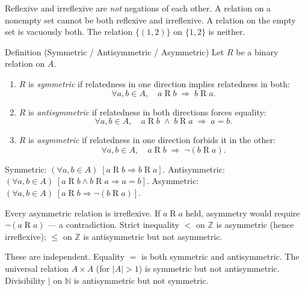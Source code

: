 \begin{remark}[Independence]
Reflexive and irreflexive are \emph{not} negations of each other.
A relation on a nonempty set cannot be both reflexive and irreflexive.
A relation on the empty set is vacuously both.
The relation $\{(1,2)\}$ on $\{1,2\}$ is neither.
\end{remark}

\begin{definitionbox}{Definition (Symmetric / Antisymmetric / Asymmetric)}
\label{def:rel-symmetric}
\label{def:rel-antisymmetric}
\label{def:rel-asymmetric}
Let $R$ be a binary relation on $A$.
\begin{enumerate}[label=(\roman*)]
  \item $R$ is \emph{symmetric} if relatedness in one direction implies
        relatedness in both:
        \[
          \forall a,b \in A,\quad a \mathrel{R} b \;\Rightarrow\; b \mathrel{R} a.
        \]
  \item $R$ is \emph{antisymmetric} if relatedness in both directions
        forces equality:
        \[
          \forall a,b \in A,\quad
          a \mathrel{R} b \;\land\; b \mathrel{R} a \;\Rightarrow\; a = b.
        \]
  \item $R$ is \emph{asymmetric} if relatedness in one direction forbids
        it in the other:
        \[
          \forall a,b \in A,\quad
          a \mathrel{R} b \;\Rightarrow\; \lnot(b \mathrel{R} a).
        \]
\end{enumerate}
\end{definitionbox}

\begin{remark}
Symmetric: $(\forall a,b \in A)\;[a \mathrel{R} b \Rightarrow b \mathrel{R} a]$.
Antisymmetric: $(\forall a,b \in A)\;
[a \mathrel{R} b \land b \mathrel{R} a \Rightarrow a = b]$.
Asymmetric: $(\forall a,b \in A)\;
[a \mathrel{R} b \Rightarrow \lnot(b \mathrel{R} a)]$.
\end{remark}

\begin{remark}
Every asymmetric relation is irreflexive.
If $a \mathrel{R} a$ held, asymmetry would require $\lnot(a \mathrel{R} a)$ —
a contradiction.
Strict inequality $<$ on $\mathbb{Z}$ is asymmetric (hence irreflexive);
$\leq$ on $\mathbb{Z}$ is antisymmetric but not asymmetric.
\end{remark}

\begin{remark}
These are independent.
Equality $=$ is both symmetric and antisymmetric.
The universal relation $A \times A$ (for $|A| > 1$) is symmetric but
not antisymmetric.
Divisibility $\mid$ on $\mathbb{N}$ is antisymmetric but not symmetric.
\end{remark}

